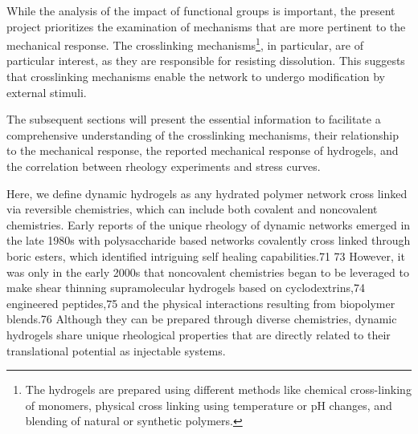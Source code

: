 
While the analysis of the impact of functional groups is important, the present project prioritizes the examination of mechanisms that are more pertinent to the mechanical response. 
The crosslinking mechanisms\footnote{The hydrogels are prepared using different methods like chemical cross-linking of monomers, physical cross linking using temperature or pH changes, and blending of natural or synthetic polymers.}, in particular, are of particular interest, as they are responsible for resisting dissolution. 
This suggests that crosslinking mechanisms enable the network to undergo modification by external stimuli.

The subsequent sections will present the essential information to facilitate a comprehensive understanding of the crosslinking mechanisms, their relationship to the mechanical response, the reported mechanical response of hydrogels, and the correlation between rheology experiments and stress curves.


Here, we define dynamic hydrogels as any hydrated polymer network cross linked via reversible chemistries, which can include both covalent and noncovalent chemistries. 
Early reports of the unique rheology of dynamic networks emerged in the late 1980s with polysaccharide based networks covalently cross linked through boric esters, which  identified intriguing self healing capabilities.71 73 
However, it was only in the early 2000s that noncovalent chemistries began to be leveraged to make shear thinning supramolecular  hydrogels based on cyclodextrins,74 engineered peptides,75 and the physical interactions resulting from biopolymer  blends.76 
Although they can be prepared through diverse chemistries, dynamic hydrogels share unique rheological properties that are directly related to their translational potential as injectable systems\citep{correaTranslationalApplicationsHydrogels2021}. 

